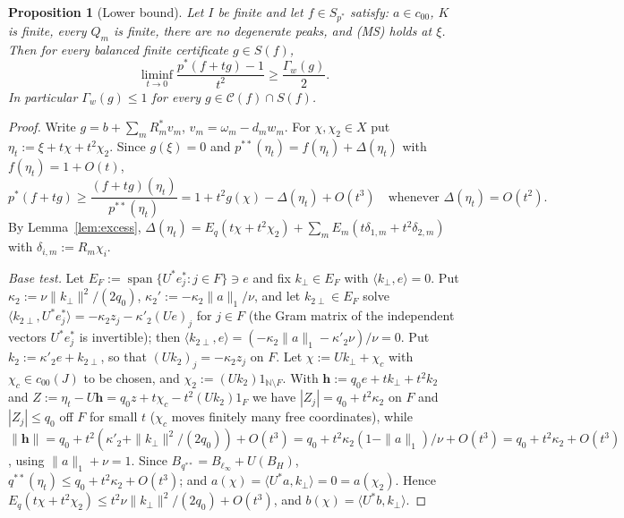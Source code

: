 \documentclass[10pt]{amsart}
\newtheorem{proposition}[theorem]{Proposition}
\theoremstyle{definition}
\theoremstyle{remark}
\newcommand{\spn}{\operatorname{span}}
\newcommand{\N}{\mathbb N}
\newcommand{\Cset}{\mathcal C}
\newcommand{\ip}[2]{\langle #1,#2\rangle}
\begin{document}
\begin{proposition}[Lower bound]\label{prop:lowerbound}
Let $I$ be finite and let $f\in S_{p^*}$ satisfy: $a\in c_{00}$, $K$ is
finite, every $Q_m$ is finite, there are no degenerate peaks, and
\textup{(MS)} holds at $\xi$.  Then for every balanced finite certificate
$g\in S(f)$,
\[
 \liminf_{t\to0}\frac{p^*(f+tg)-1}{t^2}\ge\frac{\Gamma_w(g)}2 .
\]
In particular $\Gamma_w(g)\le1$ for every $g\in\Cset(f)\cap S(f)$.
\end{proposition}

\begin{proof}
Write $g=b+\sum_mR_m^*v_m$, $v_m=\omega_m-d_mw_m$.  For $\chi,\chi_2\in X$
put $\eta_t:=\xi+t\chi+t^2\chi_2$.  Since $g(\xi)=0$ and
$p^{**}(\eta_t)=f(\eta_t)+\Delta(\eta_t)$ with $f(\eta_t)=1+O(t)$,
\begin{equation}\label{eq:testratio}
 p^*(f+tg)\ge\frac{(f+tg)(\eta_t)}{p^{**}(\eta_t)}
 =1+t^2g(\chi)-\Delta(\eta_t)+O(t^3)
 \quad\text{whenever }\Delta(\eta_t)=O(t^2).
\end{equation}
By Lemma~\ref{lem:excess},
$\Delta(\eta_t)=E_q(t\chi+t^2\chi_2)+\sum_mE_m(t\delta_{1,m}+t^2\delta_{2,m})$
with $\delta_{i,m}:=R_m\chi_i$.

\emph{Base test.}  Let $E_F:=\spn\{U^*e_j^*:j\in F\}\ni e$ and fix
$k_\perp\in E_F$ with $\ip{k_\perp}e=0$.  Put
$\kappa_2:=\nu\|k_\perp\|^2/(2q_0)$, $\kappa_2':=-\kappa_2\|a\|_1/\nu$, and
let $k_{2\perp}\in E_F$ solve $\ip{k_{2\perp}}{U^*e_j^*}=-\kappa_2z_j-
\kappa'_2(Ue)_j$ for $j\in F$ (the Gram matrix of the independent vectors
$U^*e_j^*$ is invertible); then $\ip{k_{2\perp}}{e}=(-\kappa_2\|a\|_1-
\kappa'_2\nu)/\nu=0$.  Put $k_2:=\kappa'_2e+k_{2\perp}$, so that
$(Uk_2)_j=-\kappa_2z_j$ on $F$.  Let $\chi:=Uk_\perp+\chi_c$ with
$\chi_c\in c_{00}(J)$ to be chosen, and $\chi_2:=(Uk_2)1_{\N\setminus F}$.
With $\mathbf h:=q_0e+tk_\perp+t^2k_2$ and $Z:=\eta_t-U\mathbf h=q_0z+t
\chi_c-t^2(Uk_2)1_F$ we have $|Z_j|=q_0+t^2\kappa_2$ on $F$ and $|Z_j|\le
q_0$ off $F$ for small $t$ ($\chi_c$ moves finitely many free
coordinates), while
$\|\mathbf h\|=q_0+t^2(\kappa'_2+\|k_\perp\|^2/(2q_0))+O(t^3)=q_0+t^2\kappa_2
(1-\|a\|_1)/\nu+O(t^3)=q_0+t^2\kappa_2+O(t^3)$, using $\|a\|_1+\nu=1$.
Since $B_{q^{**}}=B_{\ell_\infty}+U(B_H)$, $q^{**}(\eta_t)\le q_0+t^2\kappa_2
+O(t^3)$; and $a(\chi)=\ip{U^*a}{k_\perp}=0=a(\chi_2)$.  Hence
$E_q(t\chi+t^2\chi_2)\le t^2\nu\|k_\perp\|^2/(2q_0)+O(t^3)$, and
$b(\chi)=\ip{U^*b}{k_\perp}$.


\end{proof}
\end{document}
